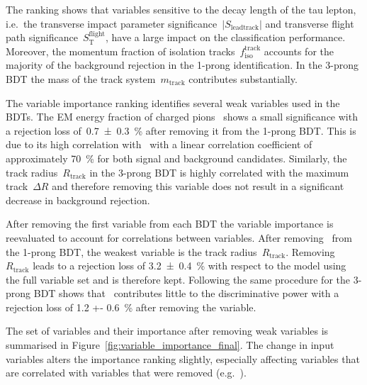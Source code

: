 The ranking shows that variables sensitive to the decay length of the tau
lepton, i.e.\ the transverse impact parameter
significance~$|S_\text{leadtrack}|$ and transverse flight path
significance~$S_\text{T}^\text{flight}$, have a large impact on the
classification performance. Moreover, the momentum fraction of isolation
tracks~$f_\text{iso}^\text{track}$ accounts for the majority of the background
rejection in the 1-prong identification. In the 3-prong BDT the mass of the
track system~$m_\text{track}$ contributes substantially.

The variable importance ranking identifies several weak variables used in the
BDTs. The EM energy fraction of charged
pions~ shows a small significance with a
rejection loss of~\SI{0.7 +- 0.3}{\percent} after removing it from the 1-prong
BDT. This is due to its high correlation
with~ with a linear correlation
coefficient of approximately \SI{70}{\percent} for both signal and background
\tauhadvis candidates. Similarly, the track radius~$R_\text{track}$ in the
3-prong BDT is highly correlated with the maximum track~$\Delta R$ and therefore
removing this variable does not result in a significant decrease in background
rejection.

After removing the first variable from each BDT the variable importance is
reevaluated to account for correlations between variables. After
removing~ from the 1-prong BDT, the
weakest variable is the track radius~$R_\text{track}$. Removing~$R_\text{track}$
leads to a rejection loss of \SI{3.2 +- 0.4}{\percent} with respect to the model
using the full variable set and is therefore kept. Following the same procedure
for the 3-prong BDT shows that~
contributes little to the discriminative power with a rejection loss of \SI{1.2
  +- 0.6}{\percent} after removing the variable.

The set of variables and their importance after removing weak variables is
summarised in Figure~\ref{fig:variable_importance_final}. The change in input
variables alters the importance ranking slightly, especially affecting variables
that are correlated with variables that were removed (e.g.\
).

